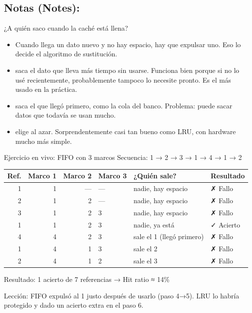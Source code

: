 \documentclass{article}
\begin{document}
\subsection{Notas (Notes):}
\label{sec:org6b33dc6}
\begin{frame}[label={sec:org2524a07}]{¿A quién saco cuando la caché está llena?}
\begin{itemize}
\item Cuando llega un dato nuevo y no hay espacio, hay que expulsar uno.
Eso lo decide el \alert{algoritmo de sustitución}.
\item[{\alert{LRU}}] saca el dato que lleva más tiempo sin usarse.
Funciona bien porque si no lo usé recientemente, probablemente
tampoco lo necesite pronto. Es el más usado en la práctica.
\item[{\alert{FIFO}}] saca el que llegó primero, como la cola del banco.
Problema: puede sacar datos que todavía se usan mucho.
\item[{\alert{Aleatorio}}] elige al azar. Sorprendentemente casi tan bueno como
LRU, con hardware mucho más simple.
\end{itemize}
\end{frame}

\begin{frame}[label={sec:orgdf645ce}]{Ejercicio en vivo: FIFO con 3 marcos}
Secuencia: \alert{1 → 2 → 3 → 1 → 4 → 1 → 2}
\begin{center}
\begin{tabular}{rrrlll}
Ref. & Marco 1 & Marco 2 & Marco 3 & ¿Quién sale? & Resultado\\[0pt]
\hline
1 & \alert{1} & — & — & nadie, hay espacio & ✗ Fallo\\[0pt]
2 & 1 & \alert{2} & — & nadie, hay espacio & ✗ Fallo\\[0pt]
3 & 1 & 2 & \alert{3} & nadie, hay espacio & ✗ Fallo\\[0pt]
1 & 1 & 2 & 3 & nadie, ya está & ✓ Acierto\\[0pt]
4 & \alert{4} & 2 & 3 & sale el 1 (llegó primero) & ✗ Fallo\\[0pt]
1 & 4 & \alert{1} & 3 & sale el 2 & ✗ Fallo\\[0pt]
2 & 4 & 1 & \alert{2} & sale el 3 & ✗ Fallo\\[0pt]
\end{tabular}
\end{center}

\alert{Resultado}: 1 acierto de 7 referencias → Hit ratio ≈ 14\%

\alert{Lección}: FIFO expulsó al 1 justo después de usarlo (paso 4→5).
LRU lo habría protegido y dado un acierto extra en el paso 6.
\end{frame}
\end{document}
